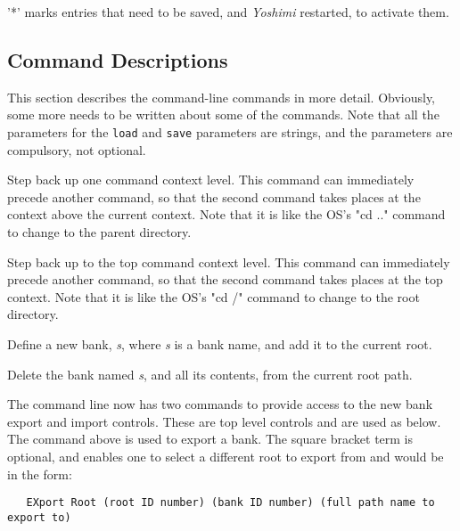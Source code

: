    '*' marks entries that need to be saved, and \textsl{Yoshimi}
   restarted, to activate them.

\subsection{Command Descriptions}
\label{subsec:command_line_command_descriptions}

   This section describes the command-line commands in more detail.
   Obviously, some more needs to be written about some of the commands.
   Note that all the parameters for the \texttt{load} and \texttt{save}
   parameters are strings, and the parameters are compulsory, not optional.

   \setcounter{ItemCounter}{0}      %

      Step back up one command context level.
      This command can immediately precede another command, so that the second
      command takes places at the context above the current context.
      Note that it is like the OS's "cd .." command to change to the parent
      directory.

      Step back up to the top command context level.
      This command can immediately precede another command, so that the second
      command takes places at the top context.
      Note that it is like the OS's "cd /" command to change to the root
      directory.

      Define a new bank, \textsl{s}, where \textsl{s} is a bank name,
      and add it to the current root.

      Delete the bank named \textsl{s}, and all its contents,
      from the current root path.

      The command line now has two commands to provide access to the new bank
      export and import controls. These are top level controls and are used as
      below.  The command above is used to export a bank. The square bracket term
      is optional, and enables one to select a different root to export from and
      would be in the form:

\begin{verbatim}
   EXport Root (root ID number) (bank ID number) (full path name to export to)
\end{verbatim}

